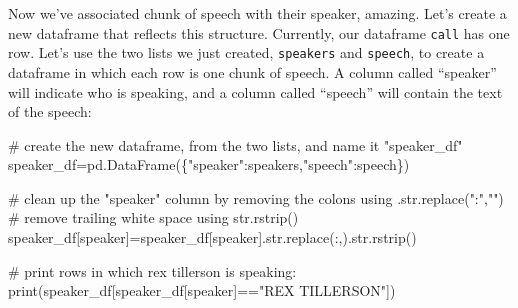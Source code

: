 \documentclass[
  letterpaper,
  DIV=11,
  numbers=noendperiod]{scrreprt}
\newenvironment{Shaded}{\begin{snugshade}}{\end{snugshade}}
\newcommand{\BuiltInTok}[1]{\textcolor[rgb]{0.00,0.23,0.31}{#1}}
\newcommand{\CommentTok}[1]{\textcolor[rgb]{0.37,0.37,0.37}{#1}}
\newcommand{\NormalTok}[1]{\textcolor[rgb]{0.00,0.23,0.31}{#1}}
\newcommand{\OperatorTok}[1]{\textcolor[rgb]{0.37,0.37,0.37}{#1}}
\newcommand{\StringTok}[1]{\textcolor[rgb]{0.13,0.47,0.30}{#1}}
\begin{document}
Now we've associated chunk of speech with their speaker, amazing. Let's
create a new dataframe that reflects this structure. Currently, our
dataframe \texttt{call} has one row. Let's use the two lists we just
created, \texttt{speakers} and \texttt{speech}, to create a dataframe in
which each row is one chunk of speech. A column called ``speaker'' will
indicate who is speaking, and a column called ``speech'' will contain
the text of the speech:

\begin{Shaded}
\begin{Highlighting}[]
\CommentTok{\# create the new dataframe, from the two lists, and name it "speaker\_df"}
\NormalTok{speaker\_df}\OperatorTok{=}\NormalTok{pd.DataFrame(\{}\StringTok{"speaker"}\NormalTok{:speakers,}\StringTok{"speech"}\NormalTok{:speech\})}

\CommentTok{\# clean up the "speaker" column by removing the colons using .str.replace(":","")}
\CommentTok{\# remove trailing white space using str.rstrip()}
\NormalTok{speaker\_df[}\StringTok{\textquotesingle{}speaker\textquotesingle{}}\NormalTok{]}\OperatorTok{=}\NormalTok{speaker\_df[}\StringTok{\textquotesingle{}speaker\textquotesingle{}}\NormalTok{].}\BuiltInTok{str}\NormalTok{.replace(}\StringTok{\textquotesingle{}:\textquotesingle{}}\NormalTok{,}\StringTok{\textquotesingle{}\textquotesingle{}}\NormalTok{).}\BuiltInTok{str}\NormalTok{.rstrip()}

\CommentTok{\# print rows in which rex tillerson is speaking:}
\BuiltInTok{print}\NormalTok{(speaker\_df[speaker\_df[}\StringTok{\textquotesingle{}speaker\textquotesingle{}}\NormalTok{]}\OperatorTok{==}\StringTok{"REX TILLERSON"}\NormalTok{])}
\end{Highlighting}
\end{Shaded}
\end{document}
